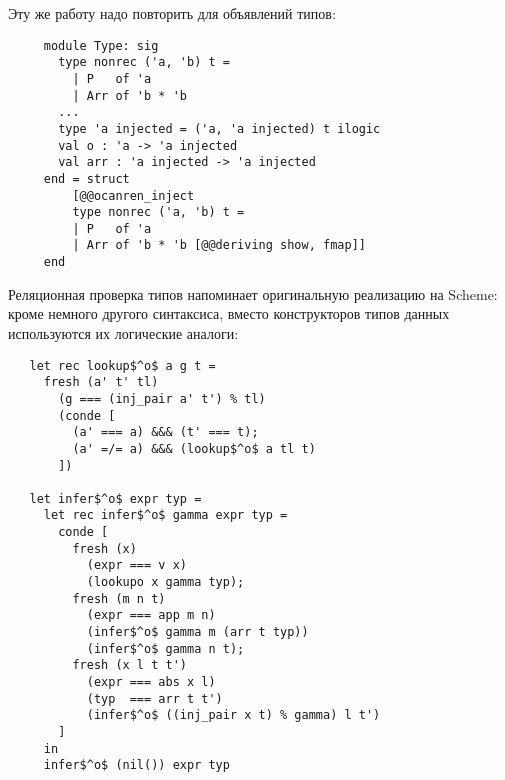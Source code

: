 Эту же работу надо повторить для объявлений типов:

\begin{lstlisting}
     module Type: sig
       type nonrec ('a, 'b) t =
         | P   of 'a
         | Arr of 'b * 'b
       ...
       type 'a injected = ('a, 'a injected) t ilogic
       val o : 'a -> 'a injected
       val arr : 'a injected -> 'a injected
     end = struct
         [@@ocanren_inject
         type nonrec ('a, 'b) t =
         | P   of 'a
         | Arr of 'b * 'b [@@deriving show, fmap]]
     end
\end{lstlisting}


Реляционная проверка типов напоминает оригинальную реализацию на Scheme: кроме немного другого синтаксиса, вместо конструкторов типов данных используются их логические аналоги:

\begin{lstlisting}
   let rec lookup$^o$ a g t =
     fresh (a' t' tl)
       (g === (inj_pair a' t') % tl)
       (conde [
         (a' === a) &&& (t' === t);
         (a' =/= a) &&& (lookup$^o$ a tl t)
       ])

   let infer$^o$ expr typ =
     let rec infer$^o$ gamma expr typ =
       conde [
         fresh (x)
           (expr === v x)
           (lookupo x gamma typ);
         fresh (m n t)
           (expr === app m n)
           (infer$^o$ gamma m (arr t typ))
           (infer$^o$ gamma n t);
         fresh (x l t t')
           (expr === abs x l)
           (typ  === arr t t')
           (infer$^o$ ((inj_pair x t) % gamma) l t')
       ]
     in
     infer$^o$ (nil()) expr typ
\end{lstlisting}
